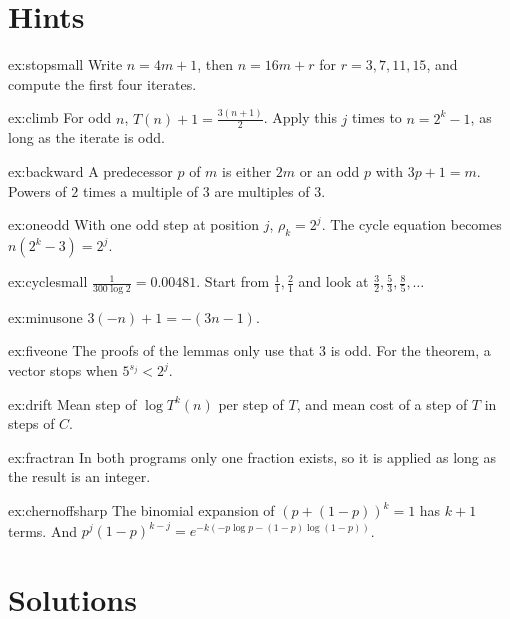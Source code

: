 \section{Hints}

\begin{hint}{ex:stopsmall}
Write $n=4m+1$, then $n=16m+r$ for $r=3,7,11,15$, and compute the first four iterates.
\end{hint}
\begin{hint}{ex:climb}
For odd $n$, $T(n)+1=\frac{3(n+1)}2$. Apply this $j$ times to $n=2^k-1$, as long as the iterate is odd.
\end{hint}
\begin{hint}{ex:backward}
A predecessor $p$ of $m$ is either $2m$ or an odd $p$ with $3p+1=m$. Powers of $2$ times a multiple of $3$ are multiples of $3$.
\end{hint}
\begin{hint}{ex:oneodd}
With one odd step at position $j$, $\rho_k=2^j$. The cycle equation becomes $n(2^k-3)=2^j$.
\end{hint}
\begin{hint}{ex:cyclesmall}
$\frac1{300\log2}=0.00481$. Start from $\frac11,\frac21$ and look at $\frac32,\frac53,\frac85,\dots$
\end{hint}
\begin{hint}{ex:minusone}
$3(-n)+1=-(3n-1)$.
\end{hint}
\begin{hint}{ex:fiveone}
The proofs of the lemmas only use that $3$ is odd. For the theorem, a vector stops when $5^{s_j}<2^j$.
\end{hint}
\begin{hint}{ex:drift}
Mean step of $\log T^k(n)$ per step of $T$, and mean cost of a step of $T$ in steps of $C$.
\end{hint}
\begin{hint}{ex:fractran}
In both programs only one fraction exists, so it is applied as long as the result is an integer.
\end{hint}
\begin{hint}{ex:chernoffsharp}
The binomial expansion of $(p+(1-p))^k=1$ has $k+1$ terms. And $p^j(1-p)^{k-j}=e^{-k(-p\log p-(1-p)\log(1-p))}$.
\end{hint}

\section{Solutions}

